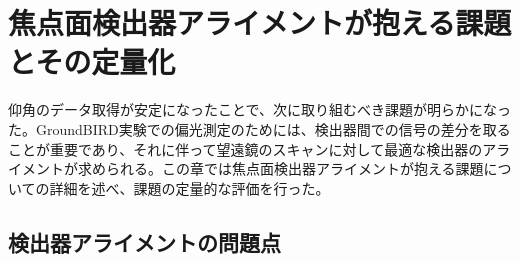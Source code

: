 \chapter{焦点面検出器アライメントが抱える課題とその定量化}
\label{chapter4_1}

仰角のデータ取得が安定になったことで、次に取り組むべき課題が明らかになった。GroundBIRD実験での偏光測定のためには、検出器間での信号の差分を取ることが重要であり、それに伴って望遠鏡のスキャンに対して最適な検出器のアライメントが求められる。この章では焦点面検出器アライメントが抱える課題についての詳細を述べ、課題の定量的な評価を行った。

\section{検出器アライメントの問題点}

